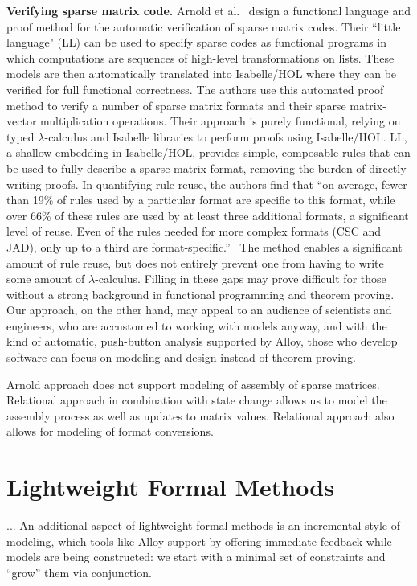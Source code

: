 \documentclass[11pt,conference]{IEEEtran}
\begin{document}
\textbf{Verifying sparse matrix code.}  Arnold et al.~\cite{arnold} design a functional language and proof method for the automatic verification of sparse matrix codes.  Their ``little language" (LL) can be used to specify sparse codes as functional programs in which computations are sequences of high-level transformations on lists.  These models are then automatically translated into Isabelle/HOL where they can be verified for full functional correctness.  The authors use this automated proof method to verify a number of sparse matrix formats and their sparse matrix-vector multiplication operations.  Their approach is purely functional, relying on typed $\lambda$-calculus and Isabelle libraries to perform proofs using Isabelle/HOL.  LL, a shallow embedding in Isabelle/HOL, provides simple, composable rules that can be used to fully describe a sparse matrix format, removing the burden of directly writing proofs.  In quantifying rule reuse, the authors find that ``on average, fewer than 19\% of rules used by a particular format are specific to this format, while over 66\% of these rules are used by at least three additional formats, a significant level of reuse.  Even of the rules needed for more complex formats (CSC and JAD), only up to a third are format-specific.''~\cite{arnold}  The method enables a significant amount of rule reuse, but does not entirely prevent one from having to write some amount of $\lambda$-calculus.  Filling in these gaps may prove difficult for those without a strong background in functional programming and theorem proving.  Our approach, on the other hand, may appeal to an audience of scientists and engineers, who are accustomed to working with models anyway, and with the kind of automatic, push-button analysis supported by Alloy, those who develop software can focus on modeling and design instead of theorem proving.

Arnold approach does not support modeling of assembly of sparse matrices.  Relational approach in combination with state change allows us to model the assembly process as well as updates to matrix values.  Relational approach also allows for modeling of format conversions.

\section{Lightweight Formal Methods}

...
An additional aspect of lightweight formal methods is an incremental style of modeling, which tools like Alloy support by offering immediate feedback while models are being constructed: we start with a minimal set of constraints and ``grow'' them via conjunction.
\end{document}
